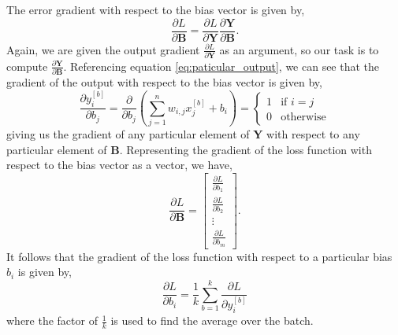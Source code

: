 \documentclass[twocolumn,pra,floatfix]{revtex4-2}
\begin{document}
                The error gradient with respect to the bias vector is given by,
                \begin{equation}
                    \frac{\partial L}{\partial \mathbf{B}} = \frac{\partial L}{\partial \mathbf{Y}} \frac{\partial \mathbf{Y}}{\partial \mathbf{B}}.
                \end{equation}
                Again, we are given the output gradient $\frac{\partial L}{\partial \mathbf{Y}}$ as an argument, so our task is to compute $\frac{\partial \mathbf{Y}}{\partial \mathbf{B}}$. Referencing equation \ref{eq:paticular_output}, we can see that the gradient of the output with respect to the bias vector is given by,
                \begin{equation}
                    \frac{\partial y^{[b]}_i}{\partial b_j} = \frac{\partial}{\partial b_j} \left( \sum_{j=1}^{n} w_{i,j} x_j^{[b]} + b_i \right) = 
                    \begin{cases}
                        1 & \text{if } i = j \\
                        0 & \text{otherwise}
                    \end{cases}
                \end{equation}
                giving us the gradient of any particular element of $\mathbf{Y}$ with respect to any particular element of $\mathbf{B}$. Representing the gradient of the loss function with respect to the bias vector as a vector, we have,
                \begin{equation}
                    \frac{\partial L}{\partial \mathbf{B}} = 
                    \begin{bmatrix}
                        \frac{\partial L}{\partial b_1} \\[0.5em]
                        \frac{\partial L}{\partial b_2} \\[0.5em]
                        \vdots \\[0.5em]
                        \frac{\partial L}{\partial b_m}
                    \end{bmatrix}.
                \end{equation}
                It follows that the gradient of the loss function with respect to a particular bias $b_i$ is given by,
                \begin{equation}
                    \frac{\partial L}{\partial b_i} = \frac{1}{k} \sum_{b=1}^{k} \frac{\partial L}{\partial y^{[b]}_i}
                \end{equation}
                where the factor of $\frac{1}{k}$ is used to find the average over the batch.
                
\end{document}
